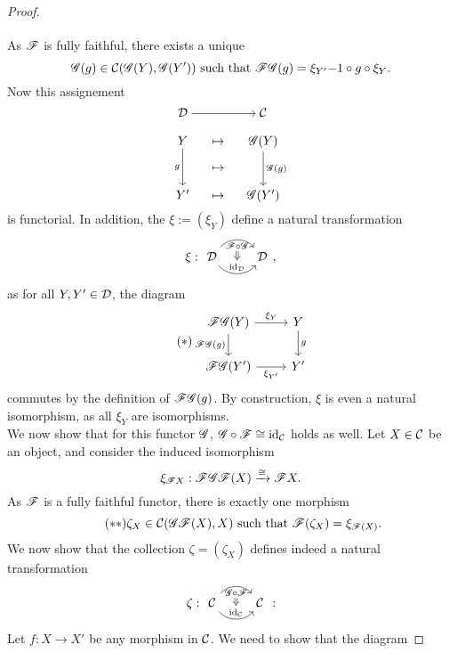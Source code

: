 \begin{proof}
\[\begin{tikzcd}
\end{tikzcd}
\]
As $\mathscr{F}$ is fully faithful, there exists a unique 
\[
\mathscr{G}(g)\in\mathcal{C}(\mathscr{G}(Y),\mathscr{G}(Y'))\text{ such that }\mathscr{F}\mathscr{G}(g) = \xi_{Y'}{-1}\circ g\circ\xi_Y.
\]
Now this assignement 
\[
\begin{tikzcd}[cramped, sep=small]
\dcat\ar{rr}&&\ccat \\
Y\ar[swap]{dd}{g}&\mapsto&\gfunc(Y)\ar{dd}{\gfunc(g)}\\
&\mapsto&\\
Y'&\mapsto&\gfunc(Y')
\end{tikzcd}
\]
is functorial. In addition, the $\xi:= (\xi_Y)$ define a natural transformation 
\[
\xi: \begin{tikzcd}
\dcat \arrow[r, bend left=50, "\ffunc \circ \gfunc"{name=U, below}]
\arrow[r, bend right=50, "\id_{\dcat}"{name=D}]
&\dcat
\arrow[Rightarrow, from=U, to=D]
\end{tikzcd},\]\coms 
as for all $Y,Y'\in \mathcal{D}$, the diagram 
\begin{equation}\label{7:etacom}\tag{$\ast$}
\begin{tikzcd}
\ffunc\gfunc(Y)\ar[swap]{d}{\ffunc\gfunc(g)}\ar{r}{\xi_Y}&Y\ar{d}{g}\\
\ffunc\gfunc(Y')\ar[swap]{r}{\xi_{Y'}}&Y'
\end{tikzcd}
\end{equation}
commutes by the definition of $\mathscr{F} \mathscr{G}(g)$.
\come
By construction, $\xi$ is even a natural isomorphism, \coms as all $\xi_Y$ are isomorphisms.\come\\
We now show that for this functor $\mathscr{G}$, $\mathscr{G} \circ \mathscr{F} \cong \operatorname{id}_{\mathcal{C}}$ holds as well. Let $X\in \mathcal{C}$ be an object, and consider the induced isomorphism
\[
\xi_{\mathscr{F} X}: \mathscr{F}\mathscr{G}\mathscr{F}(X)\xrightarrow{\cong}\mathscr{F} X.
\]
As $\mathscr{F}$ is a fully faithful functor, there is exactly one morphism 
\begin{equation}\label{7:zetadef}\tag{$\ast\ast$}
\zeta_X\in \mathcal{C}(\mathscr{G} \mathscr{F}(X),X)\text{ such that }\mathscr{F}(\zeta_X)=\xi_{\mathscr{F}(X)}.
\end{equation}
We now show that the collection $\zeta = (\zeta_X)$ defines indeed a natural transformation 
\[
\zeta: \begin{tikzcd}
\ccat \arrow[r, bend left=50, "\gfunc \circ \ffunc"{name=U, below}]
\arrow[r, bend right=50, "\id_{\ccat}"{name=D}]
&\ccat
\arrow[Rightarrow, from=U, to=D]
\end{tikzcd}:\]
Let $f:X\to X'$ be any morphism in $\mathcal{C}$. We need to show that the diagram 

\end{proof}
